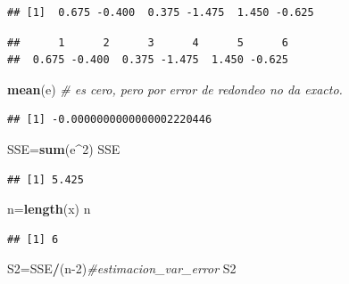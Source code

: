 \documentclass[
]{article}
\newenvironment{Shaded}{\begin{snugshade}}{\end{snugshade}}
\newcommand{\CommentTok}[1]{\textcolor[rgb]{0.56,0.35,0.01}{\textit{#1}}}
\newcommand{\DecValTok}[1]{\textcolor[rgb]{0.00,0.00,0.81}{#1}}
\newcommand{\KeywordTok}[1]{\textcolor[rgb]{0.13,0.29,0.53}{\textbf{#1}}}
\newcommand{\NormalTok}[1]{#1}
\newcommand{\OperatorTok}[1]{\textcolor[rgb]{0.81,0.36,0.00}{\textbf{#1}}}
\begin{document}
\begin{verbatim}
## [1]  0.675 -0.400  0.375 -1.475  1.450 -0.625
\end{verbatim}

\begin{Shaded}
\end{Shaded}

\begin{verbatim}
##      1      2      3      4      5      6 
##  0.675 -0.400  0.375 -1.475  1.450 -0.625
\end{verbatim}

\begin{Shaded}
\begin{Highlighting}[]
\KeywordTok{mean}\NormalTok{(e) }\CommentTok{\# es cero, pero por error de redondeo no da exacto.}
\end{Highlighting}
\end{Shaded}

\begin{verbatim}
## [1] -0.0000000000000002220446
\end{verbatim}

\begin{Shaded}
\begin{Highlighting}[]
\NormalTok{SSE=}\KeywordTok{sum}\NormalTok{(e}\OperatorTok{\^{}}\DecValTok{2}\NormalTok{)}
\NormalTok{SSE}
\end{Highlighting}
\end{Shaded}

\begin{verbatim}
## [1] 5.425
\end{verbatim}

\begin{Shaded}
\begin{Highlighting}[]
\NormalTok{n=}\KeywordTok{length}\NormalTok{(x)}
\NormalTok{n}
\end{Highlighting}
\end{Shaded}

\begin{verbatim}
## [1] 6
\end{verbatim}

\begin{Shaded}
\begin{Highlighting}[]
\NormalTok{S2=SSE}\OperatorTok{/}\NormalTok{(n}\DecValTok{{-}2}\NormalTok{)}\CommentTok{\#estimacion\_var\_error}
\NormalTok{S2}
\end{Highlighting}
\end{Shaded}
\end{document}
